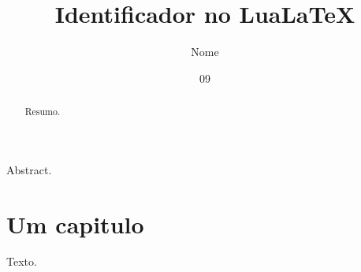 \documentclass[dsc,pdfa]{ufrj}
\title{Identificador no LuaLaTeX}
\author{Nome}{Sobrenome}
\date{09}{2026}
\begin{document}
  \maketitle
  \frontmatter
  \begin{abstract}Resumo.\end{abstract}
  \begin{foreignabstract}Abstract.\end{foreignabstract}
  \tableofcontents
  \mainmatter
  \chapter{Um capitulo}
  Texto.
\end{document}
